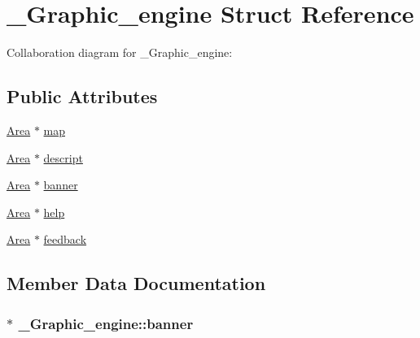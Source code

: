 \hypertarget{struct__Graphic__engine}{}\section{\+\_\+\+Graphic\+\_\+engine Struct Reference}
\label{struct__Graphic__engine}


Collaboration diagram for \+\_\+\+Graphic\+\_\+engine\+:
\subsection*{Public Attributes}
\begin{DoxyCompactItemize}
\item 
\hyperlink{screen_8h_acfdfc42f6522d75fa3c16713afde8127}{Area} $\ast$ \hyperlink{struct__Graphic__engine_a1ea06bb881d335da8c31d63b3e834bdb}{map}
\item 
\hyperlink{screen_8h_acfdfc42f6522d75fa3c16713afde8127}{Area} $\ast$ \hyperlink{struct__Graphic__engine_a414bb888ecce3389c7ce348264758e58}{descript}
\item 
\hyperlink{screen_8h_acfdfc42f6522d75fa3c16713afde8127}{Area} $\ast$ \hyperlink{struct__Graphic__engine_a440dfb2c23c3c4b7d3871187371117b9}{banner}
\item 
\hyperlink{screen_8h_acfdfc42f6522d75fa3c16713afde8127}{Area} $\ast$ \hyperlink{struct__Graphic__engine_ade1d3e95ad6def427f613a4a2d101875}{help}
\item 
\hyperlink{screen_8h_acfdfc42f6522d75fa3c16713afde8127}{Area} $\ast$ \hyperlink{struct__Graphic__engine_a4fc0ef353d000b20d57fb75d898c6d2d}{feedback}
\end{DoxyCompactItemize}


\subsection{Member Data Documentation}
\subsubsection[{\texorpdfstring{banner}{banner}}]{$\ast$ \+\_\+\+Graphic\+\_\+engine\+::banner}\hypertarget{struct__Graphic__engine_a440dfb2c23c3c4b7d3871187371117b9}{}\label{struct__Graphic__engine_a440dfb2c23c3c4b7d3871187371117b9}
